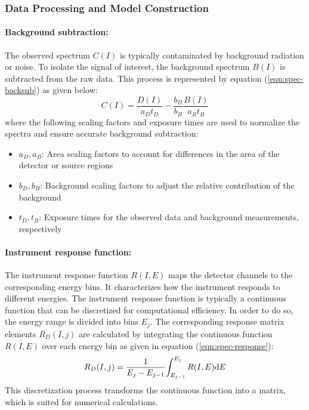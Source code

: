     		\subsubsection{Data Processing and Model Construction}
    			\paragraph{Background subtraction:}
    			The observed spectrum $C(I)$ is typically contaminated by background radiation or noise. To isolate the signal of interest, the background spectrum $B(I)$ is subtracted from the raw data. This process is represented by equation (\ref{eqn:spec-backsub}) as given below:
    			\begin{equation}
					C(I)=\dfrac{D(I)}{a_Dt_D}-\dfrac{b_D}{b_B}\dfrac{B(I)}{a_B t_B} \label{eqn:spec-backsub}
				\end{equation}
				where the following scaling factors and exposure times are used to normalize the spectra and ensure accurate background subtraction:
				\begin{itemize}
					\item $a_D,a_B$: Area scaling factors to account for differences in the area of the detector or source regions
					\item $b_D,b_B$: Background scaling factors to adjust the relative contribution of the background
					\item $t_D,t_B$: Exposure times for the observed data and background measurements, respectively
				\end{itemize}
				
				\paragraph{Instrument response function:}
				The instrument response function $R(I,E)$ maps the detector channels to the corresponding energy bins. It characterizes how the instrument responds to different energies. The instrument response function is typically a continuous function that can be discretized for computational efficiency. In order to do so, the energy range is divided into bins $E_j$. The corresponding response matrix elements $R_D(I,j)$ are calculated by integrating the continuous function $R(I,E)$ over each energy bin as given in equation (\ref{eqn:spec-response}):
				\begin{equation}
					R_D(I,j)=\dfrac{1}{E_j-E_{j-1}}{\int_{E_{j-1}}^{E_j}{R(I,E)\mathrm{d}E}} \label{eqn:spec-response}
				\end{equation}
				This discretization process transforms the continuous function into a matrix, which is suited for numerical calculations.
				

